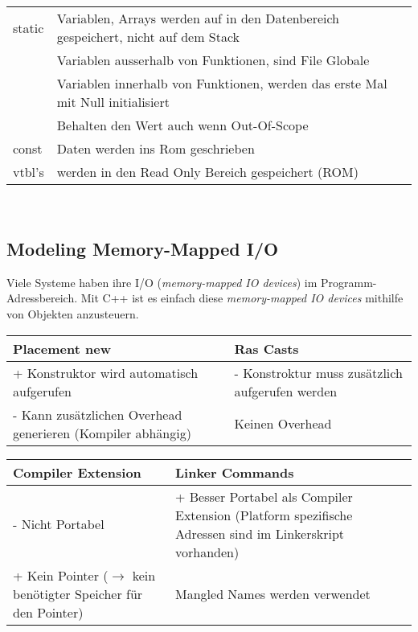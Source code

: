 \begin{tabular}{l|l}
\hline
   static   & Variablen, Arrays werden auf in den Datenbereich gespeichert, nicht auf dem Stack\\
            & Variablen ausserhalb von Funktionen, sind File Globale\\
            & Variablen innerhalb von Funktionen, werden das erste Mal mit Null initialisiert\\
            &  Behalten den Wert auch wenn Out-Of-Scope\\ \hline
    const   & Daten werden ins Rom geschrieben \\
    vtbl's  & werden in den Read Only Bereich gespeichert (ROM)
\end{tabular}\\




\subsection{Modeling Memory-Mapped I/O}
Viele Systeme haben ihre I/O (\textit{memory-mapped IO devices}) im Programm-Adressbereich.
Mit C++ ist es einfach diese \textit{memory-mapped IO devices} mithilfe von Objekten anzusteuern.

\begin{tabular}{|p{9.2cm}|p{9.2cm}|}
    \hline
    Placement new   &   Ras Casts\\
    \hline \hline
    + Konstruktor wird automatisch aufgerufen & - Konstroktur muss zusätzlich aufgerufen werden \\
    - Kann zusätzlichen Overhead generieren (Kompiler abhängig) & Keinen Overhead\\ \hline
\end{tabular}

\vspace{0.5cm}

\begin{tabular}{|p{9.2cm}|p{9.2cm}|}
    \hline
    Compiler Extension     &   Linker Commands \\
    \hline\hline
    - Nicht Portabel & + Besser Portabel als Compiler Extension (Platform spezifische Adressen sind im Linkerskript vorhanden) \\
    + Kein Pointer \newline ($\rightarrow$ kein benötigter Speicher für den Pointer) & Mangled Names werden verwendet\\ 
    \hline
\end{tabular}


